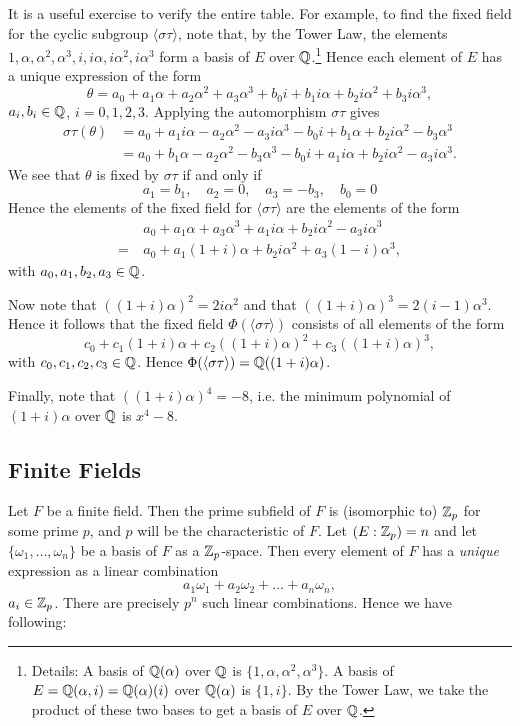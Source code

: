 \begin{example}
	It is a useful exercise to verify the entire table. For example, to find the fixed field for the cyclic subgroup $\langle \sigma\tau \rangle$, note that, by the Tower Law, the elements $1, \alpha, \alpha^2, \alpha^3, i, i\alpha, i\alpha^2, i\alpha^3$ form a basis of $E$ over $\mathbb{Q}$.\footnote{Details: A basis of $\mathbb{Q}(\alpha)$ over $\mathbb{Q}$ is $\{1, \alpha, \alpha^2, \alpha^3\}$. A basis of $E = \mathbb{Q}(\alpha, i) = \mathbb{Q}(\alpha)(i)$ over $\mathbb{Q}(\alpha)$ is $\{1, i\}$. By the Tower Law, we take the product of these two bases to get a basis of $E$ over $\mathbb{Q}$.} Hence each element of $E$ has a unique expression of the form
	\[
		\theta = a_0 + a_1 \alpha + a_2 \alpha^2 + a_3 \alpha^3 + b_0 i + b_1 i\alpha + b_2 i\alpha^2 + b_3 i\alpha^3,
	\]
	$a_i, b_i \in \mathbb{Q}$, $i = 0, 1, 2, 3$. Applying the automorphism $\sigma\tau$ gives
	\begin{align*}
		\sigma\tau(\theta) &= a_0 + a_1 i\alpha - a_2 \alpha^2 - a_3 i\alpha^3 - b_0 i + b_1 \alpha + b_2 i\alpha^2 - b_3 \alpha^3 \\
			&= a_0 + b_1 \alpha - a_2 \alpha^2 - b_3 \alpha^3 - b_0 i + a_1 i\alpha + b_2 i\alpha^2 - a_3 i\alpha^3.
	\end{align*}
	We see that $\theta$ is fixed by $\sigma\tau$ if and only if
	\[
		a_1 = b_1, \quad a_2 = 0, \quad a_3 = -b_3, \quad b_0 = 0
	\]
	Hence the elements of the fixed field for $\langle \sigma\tau \rangle$ are the elements of the form
	\begin{align*}
		&a_0 + a_1 \alpha + a_3 \alpha^3 + a_1 i\alpha + b_2 i\alpha^2 - a_3 i\alpha^3 \\
		= \ & a_0 + a_1 (1 + i) \alpha + b_2 i\alpha^2 + a_3 (1 - i) \alpha^3,
	\end{align*}
	with $a_0, a_1, b_2, a_3 \in \mathbb{Q}$.
	
	Now note that $((1 + i)\alpha)^2 = 2i\alpha^2$ and that $((1 + i)\alpha)^3 = 2(i - 1)\alpha^3$. Hence it follows that the fixed field $\Phi(\langle \sigma\tau \rangle)$ consists of all elements of the form
	\[
		c_0 + c_1 (1 + i) \alpha + c_2 ((1 + i) \alpha)^2 + c_3 ((1 + i) \alpha)^3,
	\]
	with $c_0, c_1, c_2, c_3 \in \mathbb{Q}$. Hence $\Phi(\langle \sigma\tau \rangle) = \mathbb{Q}((1 + i)\alpha)$.
	
	Finally, note that $((1 + i) \alpha)^4 = -8$, i.e. the minimum polynomial of $(1 + i)\alpha$ over $\mathbb{Q}$ is $x^4 - 8$.
\end{example}

\subsection{Finite Fields}
Let $F$ be a finite field. Then the prime subfield of $F$ is (isomorphic to) $\mathbb{Z}_p$ for some prime $p$, and $p$ will be the characteristic of $F$. Let $(E : \mathbb{Z}_p) = n$ and let $\{\omega_1, \dots, \omega_n\}$ be a basis of $F$ as a $\mathbb{Z}_p$-space. Then every element of $F$ has a \emph{unique} expression as a linear combination
\[
	a_1 \omega_1 + a_2 \omega_2 + \dots + a_n \omega_n,
\]
$a_i \in \mathbb{Z}_p$. There are precisely $p^n$ such linear combinations. Hence we have following:

